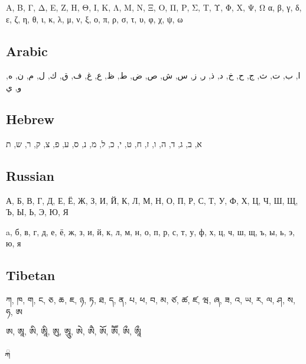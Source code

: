 \documentclass[11pt,a4paper,twoside]{book}
\begin{document}
Α, Β, Γ, Δ, Ε, Ζ, Η, Θ, Ι, Κ, Λ, Μ, Ν, Ξ, Ο, Π, Ρ, Σ, Τ, Υ, Φ, Χ, Ψ, Ω
α, β, γ, δ, ε, ζ, η, θ, ι, κ, λ, μ, ν, ξ, ο, π, ρ, σ, τ, υ, φ, χ, ψ, ω

\subsection{Arabic}
ا, ب, ت, ث, ج, ح, خ, د, ذ, ر, ز, س, ش, ص, ض, ط, ظ, ع, غ, ف, ق, ك, ل, م, ن, ه, و, ي

\subsection{Hebrew}

א, ב, ג, ד, ה, ו, ז, ח, ט, י, כ, ל, מ, נ, ס, ע, פ, צ, ק, ר, ש, ת

\subsection{Russian}

А, Б, В, Г, Д, Е, Ё, Ж, З, И, Й, К, Л, М, Н, О, П, Р, С, Т, У, Ф, Х, Ц, Ч, Ш, Щ, Ъ, Ы, Ь, Э, Ю, Я

a, б, в, г, д, е, ё, ж, з, и, й, к, л, м, н, о, п, р, с, т, у, ф, х, ц, ч, ш, щ, ъ, ы, ь, э, ю, я

\subsection{Tibetan}

ཀ, ཁ, ག, ང, ཅ, ཆ, ཇ, ཉ, ཏ, ཐ, ད, ན, པ, ཕ, བ, མ, ཙ, ཚ, ཛ, ཝ, ཞ, ཟ, འ, ཡ, ར, ལ, ཤ, ས, ཧ, ཨ

ཨ, ཨཱ, ཨི, ཨཱི, ཨུ, ཨཱུ, ཨེ, ཨཻ, ཨོ, ཨཽ, ཨྀ, ཨཱྀ

ྐ
\end{document}
